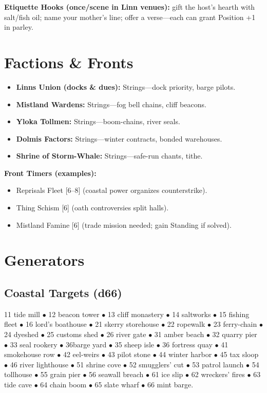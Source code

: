 \documentclass[11pt]{article}
\begin{document}
\textbf{Etiquette Hooks (once/scene in Linn venues):} gift the host's hearth with salt/fish oil; name your mother's line; offer a verse---each can grant Position +1 in parley.

\section{Factions \& Fronts}
\begin{itemize}
\item \textbf{Linns Union (docks \& dues):} Strings---dock priority, barge pilots.
\item \textbf{Mistland Wardens:} Strings---fog bell chains, cliff beacons.
\item \textbf{Yloka Tollmen:} Strings---boom-chains, river seals.
\item \textbf{Dolmis Factors:} Strings---winter contracts, bonded warehouses.
\item \textbf{Shrine of Storm-Whale:} Strings---safe-run chants, tithe.
\end{itemize}

\textbf{Front Timers (examples):}
\begin{itemize}
\item Reprisals Fleet [6--8] (coastal power organizes counterstrike).
\item Thing Schism [6] (oath controversies split halls).
\item Mistland Famine [6] (trade mission needed; gain Standing if solved).
\end{itemize}

\section{Generators}

\subsection{Coastal Targets (d66)}

11 tide mill $\bullet$ 12 beacon tower $\bullet$ 13 cliff monastery $\bullet$ 14 saltworks $\bullet$ 15 fishing fleet $\bullet$ 16 lord's boathouse $\bullet$ 21 skerry storehouse $\bullet$ 22 ropewalk $\bullet$ 23 ferry-chain $\bullet$ 24 dyeshed $\bullet$ 25 customs shed $\bullet$ 26 river gate $\bullet$ 31 amber beach $\bullet$ 32 quarry pier $\bullet$ 33 seal rookery $\bullet$ 36barge yard $\bullet$ 35 sheep isle $\bullet$ 36 fortress quay $\bullet$ 41 smokehouse row $\bullet$ 42 eel-weirs $\bullet$ 43 pilot stone $\bullet$ 44 winter harbor $\bullet$ 45 tax sloop $\bullet$ 46 river lighthouse $\bullet$ 51 shrine cove $\bullet$ 52 smugglers' cut $\bullet$ 53 patrol launch $\bullet$ 54 tollhouse $\bullet$ 55 grain pier $\bullet$ 56 seawall breach $\bullet$ 61 ice slip $\bullet$ 62 wreckers' fires $\bullet$ 63 tide cave $\bullet$ 64 chain boom $\bullet$ 65 slate wharf $\bullet$ 66 mint barge.
\end{document}
